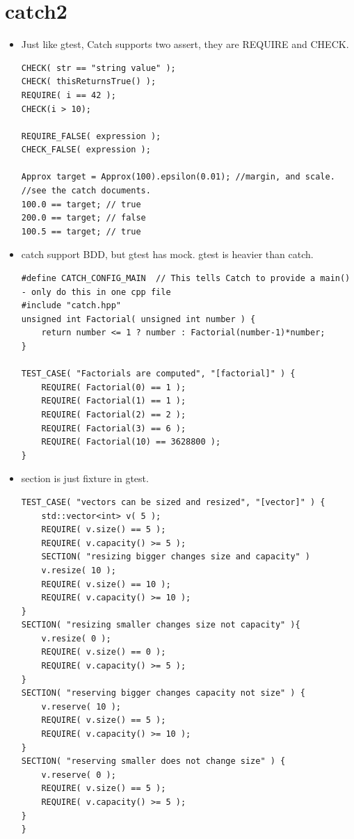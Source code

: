 \documentclass[a4paper,11pt,twoside]{book}
\begin{document}
\section{catch2}
\begin{itemize}
	\item Just like gtest, Catch supports two assert, they are REQUIRE and CHECK.
\begin{lstlisting}
CHECK( str == "string value" );
CHECK( thisReturnsTrue() );
REQUIRE( i == 42 );
CHECK(i > 10);

REQUIRE_FALSE( expression );
CHECK_FALSE( expression );

Approx target = Approx(100).epsilon(0.01); //margin, and scale. 
//see the catch documents.
100.0 == target; // true
200.0 == target; // false
100.5 == target; // true
\end{lstlisting}

	\item catch support BDD, but gtest has mock. gtest is heavier than catch.
\begin{lstlisting}
#define CATCH_CONFIG_MAIN  // This tells Catch to provide a main() - only do this in one cpp file
#include "catch.hpp"
unsigned int Factorial( unsigned int number ) {
	return number <= 1 ? number : Factorial(number-1)*number;
}

TEST_CASE( "Factorials are computed", "[factorial]" ) {   
	REQUIRE( Factorial(0) == 1 );    
	REQUIRE( Factorial(1) == 1 );    
	REQUIRE( Factorial(2) == 2 );    
	REQUIRE( Factorial(3) == 6 );    
	REQUIRE( Factorial(10) == 3628800 );
}
\end{lstlisting}

\item section is just fixture in gtest.
\begin{lstlisting}
TEST_CASE( "vectors can be sized and resized", "[vector]" ) {
	std::vector<int> v( 5 );    
	REQUIRE( v.size() == 5 );    
	REQUIRE( v.capacity() >= 5 );    
	SECTION( "resizing bigger changes size and capacity" ) 
	v.resize( 10 );        
	REQUIRE( v.size() == 10 );        
	REQUIRE( v.capacity() >= 10 );    
}    
SECTION( "resizing smaller changes size not capacity" ){
	v.resize( 0 );        
	REQUIRE( v.size() == 0 );        
	REQUIRE( v.capacity() >= 5 );    
}    
SECTION( "reserving bigger changes capacity not size" ) { 
	v.reserve( 10 );        
	REQUIRE( v.size() == 5 );        
	REQUIRE( v.capacity() >= 10 );    
}    
SECTION( "reserving smaller does not change size" ) {
	v.reserve( 0 );        
	REQUIRE( v.size() == 5 );        
	REQUIRE( v.capacity() >= 5 );    
}
}
\end{lstlisting}


\end{itemize}
\end{document}
